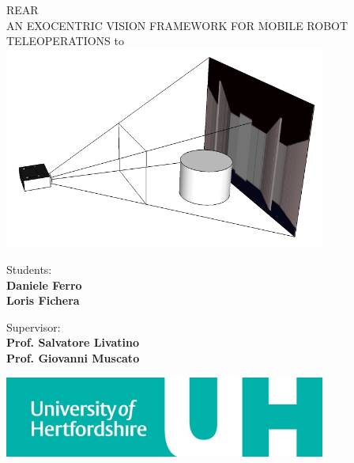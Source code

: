 \begin{titlepage}
  \begin{center}
    \uppercase{ \textsf{
        \LARGE{REAR} \\ 
        \vspace{0.5truecm}
        \large{an exocentric vision framework for mobile robot teleoperations}
    }}
    \hbox to \textwidth{\hrulefill}
    \vfill
    \includegraphics[width=300pt]{img/camera_frustum}
    \vfill
    
    \begin{flushright}
      \textsf{Students:} \\
      \textsf{\textbf{Daniele Ferro}} \\                      
      \textsf{\textbf{Loris Fichera}}
      \vspace{0.5 truecm}
                
      \textsf{Supervisor:} \\
      \textsf{\textbf{Prof. Salvatore Livatino }}\\
      \textsf{\textbf{Prof. Giovanni Muscato }}\\
    \end{flushright}
    
    \vspace{0.5 truecm}
    \hfill \includegraphics[width=300pt]{img/uni_logo.jpg}  %
    
  \end{center}
  
\end{titlepage}

\setlength{\baselineskip}{1.3\baselineskip} %

\newpage
